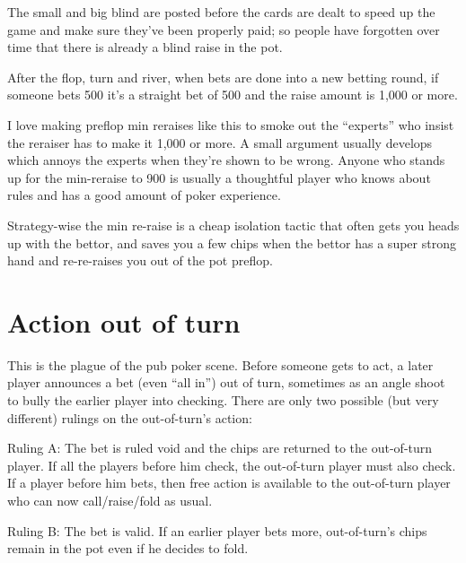 
The small and big blind are posted before the cards are dealt to
speed up the game and make sure they've been properly paid; so
people have forgotten over time that there is already a blind raise
in the pot.

After the flop, turn and river, when bets are done into a new
betting round, if someone bets 500 it's a straight bet of 500
and the raise amount is 1,000 or more.

I love making preflop min reraises like this to smoke out
the ``experts'' who insist the reraiser has to make it 1,000
or more. A small argument usually develops which annoys the
experts when they're shown to be wrong. Anyone who stands
up for the min-reraise to 900 is usually a thoughtful player
who knows about rules and has a good amount of poker experience.

Strategy-wise the min re-raise is a cheap isolation tactic
that often gets you heads up with the bettor, and saves you
a few chips when the bettor has a super strong hand and
re-re-raises you out of the pot preflop.

\section{Action out of turn}

This is the plague of the pub poker scene. Before
someone gets to act, a later player announces a bet (even ``all in'')
out of turn, sometimes as an angle shoot to bully the earlier player
into checking. There are only two possible (but very different)
rulings on the out-of-turn's action:

Ruling A: The bet is ruled void and the chips are returned to the out-of-turn
player. If all the players before him check, the out-of-turn player
must also check. If a player before him bets, then free
action is available to the out-of-turn player who can now call/raise/fold
as usual.

Ruling B: The bet is valid. If an earlier player bets more, out-of-turn's chips
remain in the pot even if he decides to fold. 


